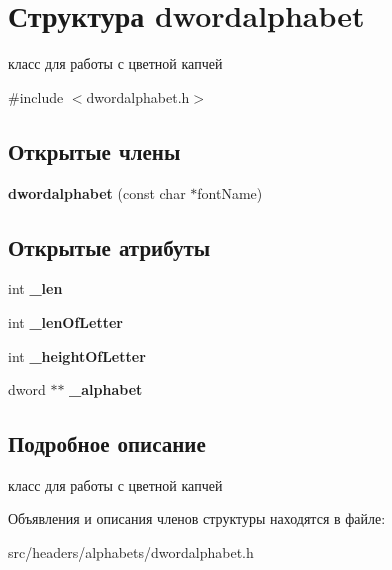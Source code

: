 \hypertarget{structdwordalphabet}{}\section{Структура dwordalphabet}
\label{structdwordalphabet}


класс для работы с цветной капчей  




{\ttfamily \#include $<$dwordalphabet.\+h$>$}

\subsection*{Открытые члены}
\begin{DoxyCompactItemize}
\item 
\mbox{\label{structdwordalphabet_aec9f647bb6774eab8dcefe502e708963}} 
{\bfseries dwordalphabet} (const char $\ast$font\+Name)
\end{DoxyCompactItemize}
\subsection*{Открытые атрибуты}
\begin{DoxyCompactItemize}
\item 
\mbox{\label{structdwordalphabet_a08eda4b2f4191ac4c90bd441079153f9}} 
int {\bfseries \+\_\+len}
\item 
\mbox{\label{structdwordalphabet_a24ad599ebbaa43a3c656b2533e673c5e}} 
int {\bfseries \+\_\+len\+Of\+Letter}
\item 
\mbox{\label{structdwordalphabet_a1c439dcbabe518fc9d0255e9ff52ba6d}} 
int {\bfseries \+\_\+height\+Of\+Letter}
\item 
\mbox{\label{structdwordalphabet_a5bc2ea785ff4299864c6e1abc9282341}} 
dword $\ast$$\ast$ {\bfseries \+\_\+alphabet}
\end{DoxyCompactItemize}


\subsection{Подробное описание}
класс для работы с цветной капчей 

Объявления и описания членов структуры находятся в файле\+:\begin{DoxyCompactItemize}
\item 
src/headers/alphabets/dwordalphabet.\+h\end{DoxyCompactItemize}
